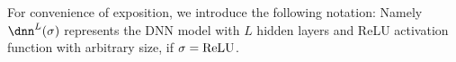 For convenience of exposition,  we introduce the following notation:
Namely $\dnn^L({\sigma})$ represents the DNN model with $L$ hidden layers and
ReLU activation function with arbitrary size, if $\sigma = {\rm ReLU}$.

